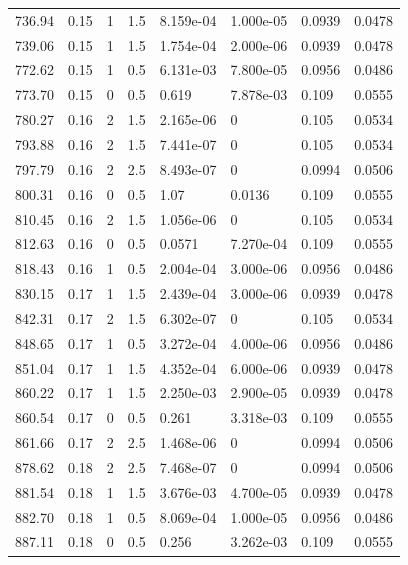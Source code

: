 \documentclass[preview]{standalone}
\begin{document}
{{{\begin{tabular}{L{1.2cm}C{1.2cm} C{0.3cm}C{0.5cm} C{1.4cm}C{1.4cm} C{1.4cm}C{1.4cm}}
  736.94  &  0.15  & 1     & 1.5 &  8.159e-04  & 1.000e-05  & 0.0939 &  0.0478   \\ 
  739.06  &  0.15  & 1     & 1.5 &  1.754e-04  & 2.000e-06  & 0.0939 &  0.0478   \\ 
  772.62  &  0.15  & 1     & 0.5 &  6.131e-03  & 7.800e-05  & 0.0956 &  0.0486   \\ 
  773.70  &  0.15  & 0     & 0.5 &  0.619  & 7.878e-03  & 0.109 &  0.0555   \\ 
  780.27  &  0.16  & 2     & 1.5 &  2.165e-06  & 0  & 0.105 &  0.0534   \\ 
  793.88  &  0.16  & 2     & 1.5 &  7.441e-07  & 0  & 0.105 &  0.0534   \\ 
  797.79  &  0.16  & 2     & 2.5 &  8.493e-07  & 0  & 0.0994 &  0.0506   \\ 
  800.31  &  0.16  & 0     & 0.5 &  1.07  & 0.0136  & 0.109 &  0.0555   \\ 
  810.45  &  0.16  & 2     & 1.5 &  1.056e-06  & 0  & 0.105 &  0.0534   \\ 
  812.63  &  0.16  & 0     & 0.5 &  0.0571  & 7.270e-04  & 0.109 &  0.0555   \\ 
  818.43  &  0.16  & 1     & 0.5 &  2.004e-04  & 3.000e-06  & 0.0956 &  0.0486   \\ 
  830.15  &  0.17  & 1     & 1.5 &  2.439e-04  & 3.000e-06  & 0.0939 &  0.0478   \\ 
  842.31  &  0.17  & 2     & 1.5 &  6.302e-07  & 0  & 0.105 &  0.0534   \\ 
  848.65  &  0.17  & 1     & 0.5 &  3.272e-04  & 4.000e-06  & 0.0956 &  0.0486   \\ 
  851.04  &  0.17  & 1     & 1.5 &  4.352e-04  & 6.000e-06  & 0.0939 &  0.0478   \\ 
  860.22  &  0.17  & 1     & 1.5 &  2.250e-03  & 2.900e-05  & 0.0939 &  0.0478   \\ 
  860.54  &  0.17  & 0     & 0.5 &  0.261  & 3.318e-03  & 0.109 &  0.0555   \\ 
  861.66  &  0.17  & 2     & 2.5 &  1.468e-06  & 0  & 0.0994 &  0.0506   \\ 
  878.62  &  0.18  & 2     & 2.5 &  7.468e-07  & 0  & 0.0994 &  0.0506   \\ 
  881.54  &  0.18  & 1     & 1.5 &  3.676e-03  & 4.700e-05  & 0.0939 &  0.0478   \\ 
  882.70  &  0.18  & 1     & 0.5 &  8.069e-04  & 1.000e-05  & 0.0956 &  0.0486   \\ 
  887.11  &  0.18  & 0     & 0.5 &  0.256  & 3.262e-03  & 0.109 &  0.0555   \\ 

\end{tabular}}}}
\end{document}
